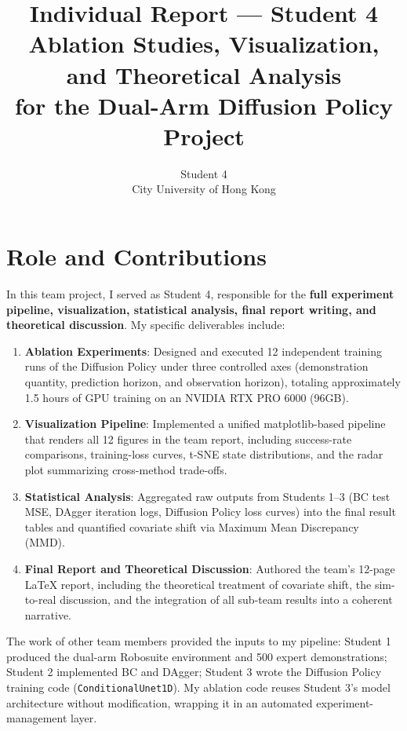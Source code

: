 \documentclass[11pt]{article}
\title{Individual Report --- Student 4 \\
\large Ablation Studies, Visualization, and Theoretical Analysis \\
for the Dual-Arm Diffusion Policy Project}
\author{Student 4 \\
City University of Hong Kong}
\date{}
\begin{document}
\maketitle

\section{Role and Contributions}

In this team project, I served as Student 4, responsible for the
\textbf{full experiment pipeline, visualization, statistical analysis,
final report writing, and theoretical discussion}. My specific
deliverables include:

\begin{enumerate}
    \item \textbf{Ablation Experiments}: Designed and executed 12
    independent training runs of the Diffusion Policy under three
    controlled axes (demonstration quantity, prediction horizon, and
    observation horizon), totaling approximately 1.5 hours of GPU
    training on an NVIDIA RTX PRO 6000 (96GB).
    \item \textbf{Visualization Pipeline}: Implemented a unified
    matplotlib-based pipeline that renders all 12 figures in the team
    report, including success-rate comparisons, training-loss curves,
    t-SNE state distributions, and the radar plot summarizing
    cross-method trade-offs.
    \item \textbf{Statistical Analysis}: Aggregated raw outputs from
    Students 1--3 (BC test MSE, DAgger iteration logs, Diffusion Policy
    loss curves) into the final result tables and quantified covariate
    shift via Maximum Mean Discrepancy (MMD).
    \item \textbf{Final Report and Theoretical Discussion}: Authored
    the team's 12-page LaTeX report, including the theoretical
    treatment of covariate shift, the sim-to-real discussion, and the
    integration of all sub-team results into a coherent narrative.
\end{enumerate}

The work of other team members provided the inputs to my pipeline:
Student 1 produced the dual-arm Robosuite environment and 500 expert
demonstrations; Student 2 implemented BC and DAgger; Student 3 wrote
the Diffusion Policy training code (\texttt{ConditionalUnet1D}). My
ablation code reuses Student 3's model architecture without
modification, wrapping it in an automated experiment-management layer.
\end{document}
